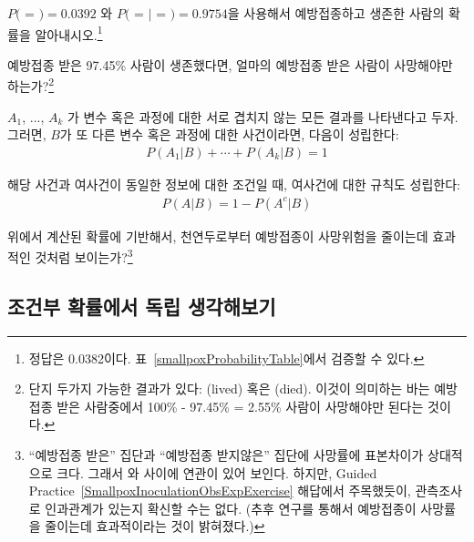 \begin{exercise}
$P($ = $) = 0.0392$ 와 $P($ =  $|$  = $) = 0.9754$을 사용해서 예방접종하고 생존한 사람의 확률을 알아내시오.\footnote{정답은 0.0382이다. 표~\ref{smallpoxProbabilityTable}에서 검증할 수 있다.}
\end{exercise}

\begin{exercise}
예방접종 받은 97.45\% 사람이 생존했다면, 얼마의 예방접종 받은 사람이 사망해야만 하는가?\footnote{
단지 두가지 가능한 결과가 있다: (lived) 혹은 (died). 이것이 의미하는 바는 예방접종 받은 사람중에서 100\% - 97.45\% = 2.55\% 사람이 사망해야만 된다는 것이다.}
\end{exercise}

\begin{termBox}{
$A_1$, ..., $A_k$ 가 변수 혹은 과정에 대한 서로 겹치지 않는 모든 결과를 나타낸다고 두자. 그러면, $B$가 또 다른 변수 혹은 과정에 대한 사건이라면, 다음이 성립한다: \vspace{-1mm}
\begin{eqnarray*}
P(A_1|B)+\cdots+P(A_k|B) = 1
\end{eqnarray*}\vspace{-5.5mm} \par
해당 사건과 여사건이 동일한 정보에 대한 조건일 때, 여사건에 대한 규칙도 성립한다: \vspace{-1.5mm}
\begin{eqnarray*}
P(A | B) = 1 - P(A^c | B)
\end{eqnarray*}}
\end{termBox}

\begin{exercise}
위에서 계산된 확률에 기반해서, 천연두로부터 예방접종이 사망위험을 줄이는데 효과적인 것처럼 보이는가?\footnote{
``예방접종 받은'' 집단과 ``예방접종 받지않은'' 집단에 사망률에 표본차이가 상대적으로 크다. 그래서  와  사이에 연관이 있어 보인다. 하지만, Guided Practice~\ref{SmallpoxInoculationObsExpExercise} 해답에서 주목했듯이, 관측조사로 인과관계가 있는지 확신할 수는 없다. (추후 연구를 통해서 예방접종이 사망률을 줄이는데 효과적이라는 것이 밝혀졌다.)}
\end{exercise}

\subsection{조건부 확률에서 독립 생각해보기}

